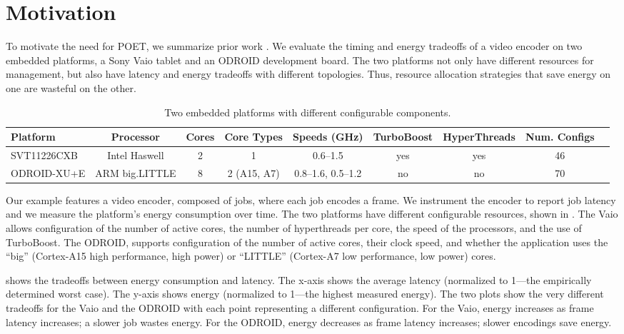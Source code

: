 \section{Motivation}
\label{sec:poet-motivation}

To motivate the need for POET, we summarize prior work \cite{Imes2014}.
We evaluate the timing and energy tradeoffs of a video encoder on two embedded platforms, a Sony Vaio tablet and an ODROID development board.
The two platforms not only have different resources for management, but also have latency and energy tradeoffs with different topologies.
Thus, resource allocation strategies that save energy on one are wasteful on the other.

\begin{table}[t]
\caption{Two embedded platforms with different configurable components.}
\label{tbl:poet-machines}
\tiny
\centering
\begin{tabular}{lcccccccc}
  \textbf{Platform} & 
  \textbf{Processor} &
  \textbf{Cores} & 
  \textbf{Core Types} &
  \textbf{Speeds (GHz)} &
  \textbf{TurboBoost} &
  \textbf{HyperThreads} & 
  \textbf{Num. Configs} \\
  \hline
  \hline
  SVT11226CXB & Intel Haswell  & 2 & 1             & 0.6--1.5          & yes & yes & 46 \\
  ODROID-XU+E & ARM big.LITTLE & 8 & 2 (A15, A7)   & 0.8--1.6, 0.5--1.2 & no  & no  & 70 \\
  \hline 
  \hline
\end{tabular}
\end{table}

Our example features a video encoder, composed of jobs, where each job encodes a frame.
We instrument the encoder to report job latency and we measure the platform's energy consumption over time.
The two platforms have different configurable resources, shown in .
The Vaio allows configuration of the number of active cores, the number of hyperthreads per core, the speed of the processors, and the use of TurboBoost.
The ODROID, supports configuration of the number of active cores, their clock speed, and whether the application uses the ``big'' (Cortex-A15 high performance, high power) or ``LITTLE'' (Cortex-A7 low performance, low power) cores.

 shows the tradeoffs between energy consumption and latency.
The x-axis shows the average latency (normalized to 1---the empirically determined worst case).
The y-axis shows energy (normalized to 1---the highest measured energy).
The two plots show the very different tradeoffs for the Vaio and the ODROID with each point representing a different configuration.
For the Vaio, energy increases as frame latency increases; \ie a slower job wastes energy.
For the ODROID, energy decreases as frame latency increases; \ie slower encodings save energy.

